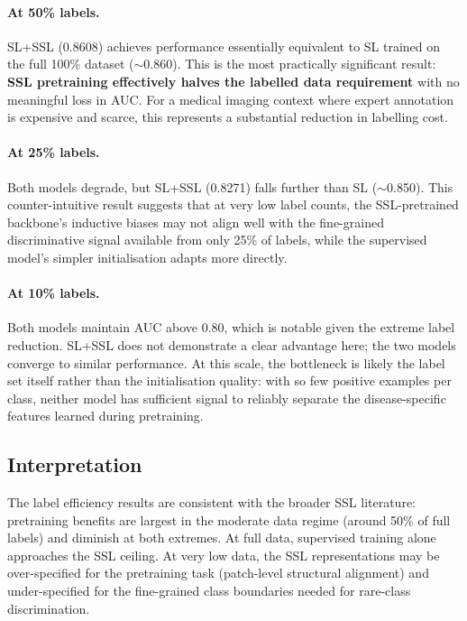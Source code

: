 \paragraph{At 50\% labels.} SL+SSL (0.8608) achieves performance essentially equivalent to SL trained on the full 100\% dataset ($\sim$0.860). This is the most practically significant result: \textbf{SSL pretraining effectively halves the labelled data requirement} with no meaningful loss in AUC. For a medical imaging context where expert annotation is expensive and scarce, this represents a substantial reduction in labelling cost.

\paragraph{At 25\% labels.} Both models degrade, but SL+SSL (0.8271) falls further than SL ($\sim$0.850). This counter-intuitive result suggests that at very low label counts, the SSL-pretrained backbone's inductive biases may not align well with the fine-grained discriminative signal available from only 25\% of labels, while the supervised model's simpler initialisation adapts more directly.

\paragraph{At 10\% labels.} Both models maintain AUC above 0.80, which is notable given the extreme label reduction. SL+SSL does not demonstrate a clear advantage here; the two models converge to similar performance. At this scale, the bottleneck is likely the label set itself rather than the initialisation quality: with so few positive examples per class, neither model has sufficient signal to reliably separate the disease-specific features learned during pretraining.

\subsection{Interpretation}

The label efficiency results are consistent with the broader SSL literature: pretraining benefits are largest in the moderate data regime (around 50\% of full labels) and diminish at both extremes. At full data, supervised training alone approaches the SSL ceiling. At very low data, the SSL representations may be over-specified for the pretraining task (patch-level structural alignment) and under-specified for the fine-grained class boundaries needed for rare-class discrimination.

